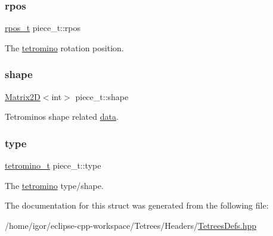 \subsubsection{\texorpdfstring{rpos}{rpos}}
{\footnotesize\ttfamily \hyperlink{TetreesDefs_8hpp_ae8c3bf9765f183eabf1106110513afc6}{rpos\+\_\+t} piece\+\_\+t\+::rpos}

The \hyperlink{TetreesDefs_8hpp_adf4f8e2cbbd7d8894fe3beda39db1b8f}{tetromino} rotation position. \mbox{\label{structpiece__t_a3c8f9c2e51c6bab728e564143c439746}} 
\subsubsection{\texorpdfstring{shape}{shape}}
{\footnotesize\ttfamily \hyperlink{classMatrix2D}{Matrix2D}$<$int$>$ piece\+\_\+t\+::shape}

Tetromino\textquotesingle{}s shape related \hyperlink{classTetreesUtils_acb377319f6772d9e88f677273c895912}{data}. \mbox{\label{structpiece__t_ac5cbbdb5ff335128af8ca9f491a4f543}} 
\subsubsection{\texorpdfstring{type}{type}}
{\footnotesize\ttfamily \hyperlink{TetreesDefs_8hpp_acd279a62a49ecee418dd808ac39a1795}{tetromino\+\_\+t} piece\+\_\+t\+::type}

The \hyperlink{TetreesDefs_8hpp_adf4f8e2cbbd7d8894fe3beda39db1b8f}{tetromino} type/shape. 

The documentation for this struct was generated from the following file\+:\begin{DoxyCompactItemize}
\item 
/home/igor/eclipse-\/cpp-\/workspace/\+Tetrees/\+Headers/\hyperlink{TetreesDefs_8hpp}{Tetrees\+Defs.\+hpp}\end{DoxyCompactItemize}
